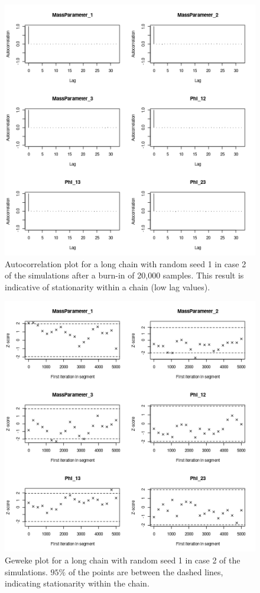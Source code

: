 \documentclass[14pt]{extarticle} %
\begin{document}
	
	\begin{figure}[!htb]
		\centering
		\includegraphics[scale=0.65]{Images/Gen_data/Case_2/Auto_correlation_plot_burn_20000_1.png}
		\caption{Autocorrelation plot for a long chain with random seed 1 in case 2 of the simulations after a burn-in of 20,000 samples. This result is indicative of stationarity within a chain (low lag values).}
		\label{fig:gen_data_case_2_autocorrelation_plot_burn_20000_1}
	\end{figure}
	
	
	\begin{figure}[!htb]
			\centering
			\includegraphics[scale=0.65]{Images/Gen_data/Case_2/Geweke_plot_burn_20000_1.png}
			\caption{Geweke plot for a long chain with random seed 1 in case 2 of the simulations. $95\%$ of the points are between the dashed lines, indicating stationarity within the chain.}
			\label{fig:gen_data_case_2_geweke_plot_1}
		\end{figure}
		
\end{document}
